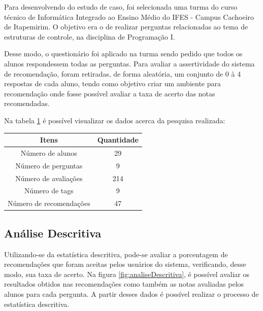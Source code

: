 Para desenvolvendo do estudo de caso, foi selecionada uma turma do curso técnico de Informática Integrado ao Ensino Médio do IFES - Campus Cachoeiro de Itapemirim. O objetivo era o de realizar perguntas relacionadas ao tema de estruturas de controle, na disciplina de Programação I.

Desse modo, o questionário foi aplicado na turma sendo pedido que todos os alunos respondessem todas as perguntas. Para avaliar a assertividade do sistema de recomendação, foram retiradas, de forma aleatória, um conjunto de 0 à 4 respostas de cada aluno, tendo como objetivo criar um ambiente para recomendação onde fosse possível avaliar a taxa de acerto das notas recomendadas.

Na tabela \ref{table:resultadosEstudoCasoEdu} é possível visualizar os dados acerca da pesquisa realizada:

\begin{table}[H]
\centering
\begin{tabular}{|c|c|}
\hline
\textbf{Itens}          & \textbf{Quantidade} \\ \hline
Número de alunos        & 29                  \\ \hline
Número de perguntas     & 9                   \\ \hline
Número de avaliações    & 214                 \\ \hline
Número de tags          & 9                   \\ \hline
Número de recomendações & 47                  \\ \hline
\end{tabular}
\label{table:resultadosEstudoCasoEdu} 
\end{table}

\subsection{Análise Descritiva}

Utilizando-se da estatística descritiva, pode-se avaliar a porcentagem de recomendações que foram aceitas pelos usuários do sistema, verificando, desse modo, sua taxa de acerto. Na figura \ref{fig:analiseDescritiva}, é possível avaliar os resultados obtidos nas recomendações como também as notas avaliadas pelos alunos para cada pergunta. A partir desses dados é possível realizar o processo de estatística descritiva.


